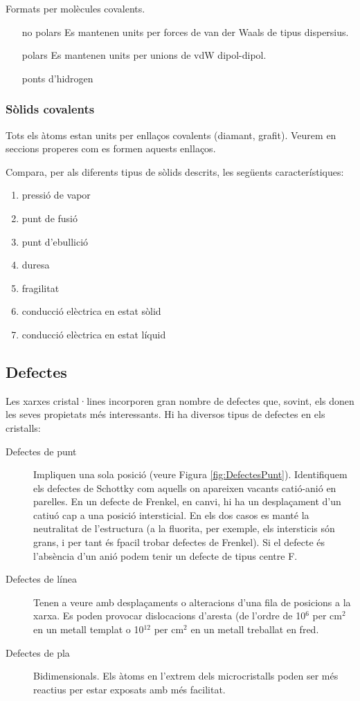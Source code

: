 Formats per molècules covalents. 
\begin{itemize}
\item[no polars] Es mantenen units per forces de van der Waals de tipus dispersius.
\item[polars] Es mantenen units per unions de vdW dipol-dipol.
\item[ponts d'hidrogen] 
\end{itemize}  

\subsubsection{Sòlids covalents}

Tots els àtoms estan units per enllaços covalents (diamant, grafit). Veurem en seccions properes com es formen aquests enllaços.


\begin{exr}
Compara, per als diferents tipus de sòlids descrits, les següents característiques:
\begin{enumerate}
\item pressió de vapor
\item punt de fusió
\item punt d'ebullició
\item duresa
\item fragilitat
\item conducció elèctrica en estat sòlid
\item conducció elèctrica en estat líquid
\end{enumerate}
\end{exr}

\subsection{Defectes}

Les xarxes cristal·lines  incorporen gran nombre de defectes que, sovint, els donen les seves propietats més interessants. Hi ha diversos tipus de defectes en els cristalls:
\begin{description}
\item[Defectes de punt] Impliquen una sola posició (veure Figura \ref{fig:DefectesPunt}). Identifiquem els defectes de Schottky com aquells on apareixen vacants catió-anió en parelles. En un defecte de Frenkel, en canvi, hi ha un desplaçament d'un catiuó cap a una posició intersticial. En els dos casos es manté la neutralitat de l'estructura (a la fluorita, per exemple, els intersticis són grans, i per tant és fpacil trobar defectes de Frenkel). Si el defecte és l'absència d'un anió podem tenir un defecte de tipus centre F.
\item[Defectes de línea] Tenen a veure amb desplaçaments o alteracions d'una fila de posicions a la xarxa. Es poden provocar dislocacions d'aresta (de l'ordre de 10$^6$ per cm$^2$ en un metall templat o 10$^{12}$ per cm$^2$ en un metall treballat en fred.
\item[Defectes de pla] Bidimensionals. Els àtoms en l'extrem dels microcristalls poden ser més reactius per estar exposats amb més facilitat.
\end{description}

